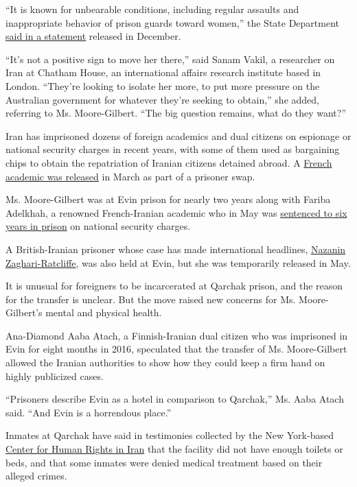 ``It is known for unbearable conditions, including regular assaults and
inappropriate behavior of prison guards toward women,'' the State
Department
\href{https://www.state.gov/this-week-in-iran-policy-december-2-6/}{said
in a statement} released in December.

``It's not a positive sign to move her there,'' said Sanam Vakil, a
researcher on Iran at Chatham House, an international affairs research
institute based in London. ``They're looking to isolate her more, to put
more pressure on the Australian government for whatever they're seeking
to obtain,'' she added, referring to Ms. Moore-Gilbert. ``The big
question remains, what do they want?''

Iran has imprisoned dozens of foreign academics and dual citizens on
espionage or national security charges in recent years, with some of
them used as bargaining chips to obtain the repatriation of Iranian
citizens detained abroad. A
\href{https://www.nytimes.com/2020/03/21/world/middleeast/prisoner-swap-france-iran.html}{French
academic was released} in March as part of a prisoner swap.

Ms. Moore-Gilbert was at Evin prison for nearly two years along with
Fariba Adelkhah, a renowned French-Iranian academic who in May was
\href{https://www.nytimes.com/2020/05/16/world/middleeast/fariba-adelkah-iran.html}{sentenced
to six years in prison} on national security charges.

A British-Iranian prisoner whose case has made international headlines,
\href{https://www.nytimes.com/2020/05/20/world/europe/iran-uk-nazanin-zaghari-ratcliffe.html}{Nazanin
Zaghari-Ratcliffe}, was also held at Evin, but she was temporarily
released in May.

It is unusual for foreigners to be incarcerated at Qarchak prison, and
the reason for the transfer is unclear. But the move raised new concerns
for Ms. Moore-Gilbert's mental and physical health.

Ana-Diamond Aaba Atach, a Finnish-Iranian dual citizen who was
imprisoned in Evin for eight months in 2016, speculated that the
transfer of Ms. Moore-Gilbert allowed the Iranian authorities to show
how they could keep a firm hand on highly publicized cases.

``Prisoners describe Evin as a hotel in comparison to Qarchak,'' Ms.
Aaba Atach said. ``And Evin is a horrendous place.''

Inmates at Qarchak have said in testimonies collected by the New
York-based
\href{https://iranhumanrights.org/2019/08/prisoners-in-irans-gharchak-prison-for-women-protest-inhumane-living-conditions/}{Center
for Human Rights in Iran} that the facility did not have enough toilets
or beds, and that some inmates were denied medical treatment based on
their alleged crimes.

